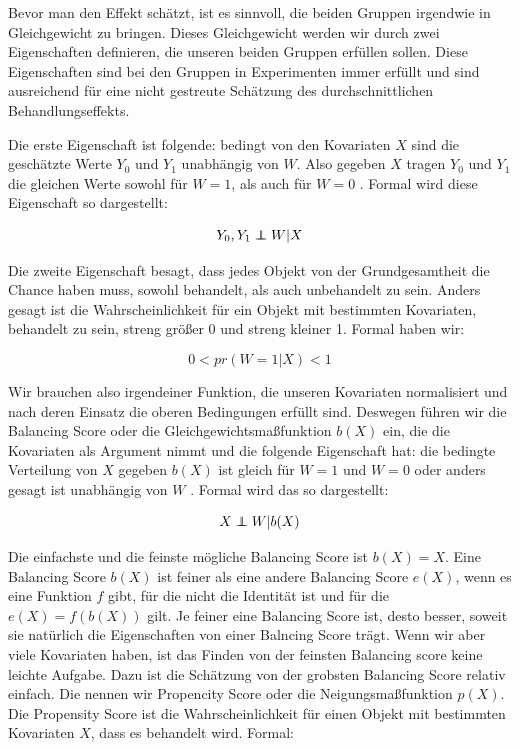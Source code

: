 \documentclass[12pt,a4paper,twoside]{scrartcl}
\numberwithin{equation}{section}
\newcommand\independent{\protect\mathpalette{\protect\independenT}{\perp}}
\def\independenT#1#2{\mathrel{\rlap{$#1#2$}\mkern2mu{#1#2}}}
\begin{document}
\noindent
Bevor man den Effekt schätzt, ist es sinnvoll, die beiden Gruppen irgendwie in Gleichgewicht zu bringen. Dieses Gleichgewicht werden wir durch zwei Eigenschaften definieren, die unseren beiden Gruppen erfüllen sollen. Diese Eigenschaften sind bei den Gruppen in Experimenten immer erfüllt und sind ausreichend für eine nicht gestreute Schätzung des durchschnittlichen Behandlungseffekts.\par

\noindent
Die erste Eigenschaft ist folgende: bedingt von den Kovariaten $X$ sind die geschätzte Werte $Y_0$ und $Y_1$ unabhängig von $W$. Also gegeben $X$ tragen $Y_0$ und $Y_1$ die gleichen Werte sowohl für $W = 1$, als auch für $W = 0$ \cite{rosenbaum1983central}. Formal wird diese Eigenschaft so dargestellt:\par
 
\begin{equation}\label{eq:2.3}
  Y_0,Y_1 \independent W|X
\end{equation}

\noindent
Die zweite Eigenschaft besagt, dass jedes Objekt von der Grundgesamtheit die Chance haben muss, sowohl behandelt, als auch unbehandelt zu sein. Anders gesagt ist die Wahrscheinlichkeit für ein Objekt mit bestimmten Kovariaten, behandelt zu sein, streng größer 0 und streng kleiner 1\cite{rosenbaum1983central}. Formal haben wir:\par

\begin{equation}\label{eq:2.4}
 0 < pr(W=1|X)<1
\end{equation}

\noindent
Wir brauchen also irgendeiner Funktion, die unseren Kovariaten normalisiert und nach deren Einsatz die oberen Bedingungen erfüllt sind. Deswegen führen wir die Balancing Score oder die Gleichgewichtsmaßfunktion $b(X)$ ein, die die Kovariaten als Argument nimmt und die folgende Eigenschaft hat: die bedingte Verteilung von $X$ gegeben $b(X)$ ist gleich für $W = 1$ und $W = 0$ oder anders gesagt ist unabhängig von $W$ \cite{dawid1976properties}. Formal wird das so dargestellt:\par

\begin{equation}\label{eq:2.5}
  X \independent W|b(X)
\end{equation}

\noindent     
Die einfachste und die feinste mögliche Balancing Score ist $b(X) = X$. Eine Balancing Score $b(X)$ ist feiner als eine andere Balancing Score $e(X)$, wenn es eine Funktion $f$ gibt, für die nicht die Identität ist und für die $e(X) = f(b(X))$ gilt. Je feiner eine Balancing Score ist, desto besser, soweit sie natürlich die Eigenschaften von einer Balncing Score trägt. Wenn wir aber viele Kovariaten haben, ist das Finden von der feinsten Balancing score keine leichte Aufgabe. Dazu ist die Schätzung von der grobsten Balancing Score relativ einfach. Die nennen wir Propencity Score oder die Neigungsmaßfunktion $p(X)$. Die Propensity Score ist die Wahrscheinlichkeit für einen Objekt mit bestimmten Kovariaten $X$, dass es behandelt wird. Formal: \par 
\end{document}
